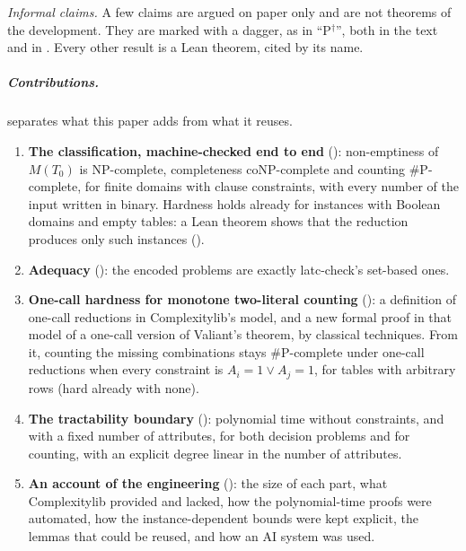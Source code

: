 \documentclass[pdflatex,sn-mathphys-num]{sn-jnl}
\theoremstyle{thmstyleone}
\theoremstyle{thmstylethree}
\newcommand{\informal}{\ensuremath{^{\dagger}}}
\begin{document}
\emph{Informal claims.} A few claims are argued on paper only and are not theorems of the
development. They are marked with a dagger, as in ``P\informal'', both in the text and in
. Every other result is a Lean theorem, cited by its name.

\subparagraph*{Contributions.}
 separates what this paper adds from what it reuses.
\begin{enumerate}
\item \textbf{The classification, machine-checked end to end} ():
  non-emptiness of $M(T_0)$ is NP-complete, completeness coNP-complete and counting \#P-complete,
  for finite domains with clause constraints, with every number of the input written in binary.
  Hardness holds already for instances with Boolean domains and empty tables: a Lean theorem
  shows that the reduction produces only such instances ().
\item \textbf{Adequacy} (): the encoded problems are exactly latc-check's
  set-based ones.
\item \textbf{One-call hardness for monotone two-literal counting} (): a
  definition of one-call reductions in Complexitylib's model, and a new formal proof in that
  model of a one-call version of Valiant's theorem, by classical techniques. From it, counting
  the missing combinations stays \#P-complete under one-call reductions when every constraint is
  $A_i = 1 \lor A_j = 1$, for tables with arbitrary rows (hard already with none).
\item \textbf{The tractability boundary} (): polynomial time without
  constraints, and with a fixed number of attributes, for both decision problems and for
  counting, with an explicit degree linear in the number of attributes.
\item \textbf{An account of the engineering} (): the size of each part,
  what Complexitylib provided and lacked, how the polynomial-time proofs were automated, how the
  instance-dependent bounds were kept explicit, the lemmas that could be reused, and how an AI
  system was used.
\end{enumerate}
\end{document}

